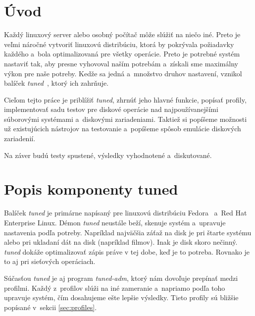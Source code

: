 %
%

\chapter{Úvod}

Každý linuxový server alebo osobný počítač môže slúžiť na niečo iné. Preto je
veľmi náročné vytvoriť linuxovú distribúciu, ktorá by pokrývala požiadavky
každého a~bola optimalizovaná pre všetky operácie. Preto je potrebné systém
nastaviť tak, aby presne vyhovoval naším potrebám a~získali sme maximálny výkon
pre naše potreby. Kedže sa jedná a~množstvo druhov nastavení, vznikol balíček
\emph{tuned}~\cite{tunedHomepage}, ktorý ich zahrňuje.

Cieľom tejto práce je priblížiť \emph{tuned}, zhrnúť jeho hlavné funkcie,
popísať profily, implementovať sadu testov pre diskové operácie nad
najpoužívanejšími súborovými systémami a~diskovými zariadeniami. Taktiež si
popíšeme možnosti už existujúcich nástrojov na testovanie a~popíšeme spôsob
emulácie diskových zariadenií.

Na záver budú testy spustené, výsledky vyhodnotené a~diskutované.

%
%

\chapter{Popis komponenty tuned}

Balíček \emph{tuned} je primárne napísaný pre linuxovú distribúciu
Fedora~\cite{fedoraHomepage} a~Red Hat Enterprise Linux. Démon \emph{tuned} neustále
beží, skenuje systém a~upravuje nastavenia podľa potreby. Napríklad najväčšia
záťaž na disk je pri štarte systému alebo pri ukladaní dát na disk (napríklad
filmov). Inak je disk skoro nečinný. \emph{tuned} dokáže optimalizovať zápis práve v
tej dobe, keď je to potreba. Rovnako je to aj pri sieťových operáciach.


Súčasťou \emph{tuned} je aj program \emph{tuned-adm}, ktorý nám dovoľuje
prepínať medzi profilmi. Každý z~profilov slúži na iné zameranie a~napriamo
podľa toho upravuje systém, čím dosahujeme ešte lepšie výsledky. Tieto profily
sú bližšie popísané v~sekcii \ref{sec:profiles}.

